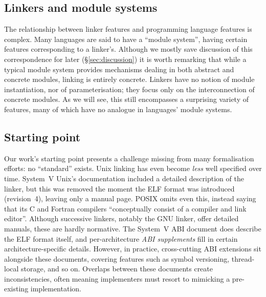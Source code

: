 \subsection{Linkers and module systems}

The relationship between linker features and programming language features is complex.
Many languages are said to have a ``module system'', having certain features corresponding to a linker's.
Although we mostly save discussion of this correspondence for later (\S\ref{sec:discussion})
it is worth remarking that while a typical module system provides mechanisms dealing in both abstract and concrete modules, linking is entirely concrete.
Linkers have no notion of module instantiation, nor of parameterisation; they focus only on the interconnection of concrete modules.
As we will see, this still encompasses a surprising variety of features, many of which have no analogue in languages' module systems.

\subsection{Starting point}

Our work's starting point presents a challenge missing from many formalisation efforts:
no ``standard'' exists.
Unix linking has even become \emph{less} well specified over time.
System~V Unix's documentation included a detailed description of the linker,
but this was removed the moment the ELF format was introduced (revision~4), 
leaving only a manual page.
POSIX \citep{} omits even this, instead saying that its C and Fortran compilers 
``conceptually consist of a compiler and link editor''.
Although successive linkers, notably the GNU linker, offer detailed manuals, 
these are hardly normative.
The System~V ABI document \citep{} does describe the ELF format itself,
and per-architecture \emph{ABI supplements} fill in certain architecture-specific
details.
However, in practice, cross-cutting ABI extensions sit alongside these documents, covering features such as symbol versioning, thread-local storage, and so on.
Overlaps between these documents create inconsistencies, often meaning implementers must resort to mimicking a pre-existing implementation.
